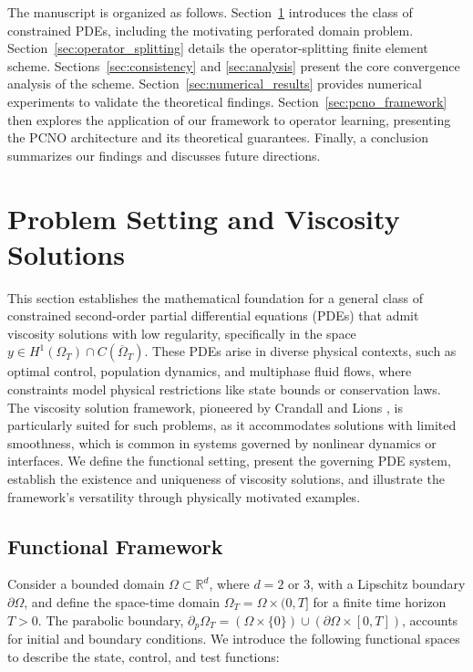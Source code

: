 \documentclass[pdflatex,sn-mathphys-num]{sn-jnl}%
\theoremstyle{thmstyleone}%
\numberwithin{equation}{section}
\begin{document}
The manuscript is organized as follows. Section~\ref{sec:problem} introduces the class of constrained PDEs, including the motivating perforated domain problem. Section~\ref{sec:operator_splitting} details the operator-splitting finite element scheme. Sections~\ref{sec:consistency} and \ref{sec:analysis} present the core convergence analysis of the scheme. Section~\ref{sec:numerical_results} provides numerical experiments to validate the theoretical findings. Section~\ref{sec:pcno_framework} then explores the application of our framework to operator learning, presenting the PCNO architecture and its theoretical guarantees. Finally, a conclusion summarizes our findings and discusses future directions.

\section{Problem Setting and Viscosity Solutions}
\label{sec:problem}

This section establishes the mathematical foundation for a general class of constrained second-order partial differential equations (PDEs) that admit viscosity solutions with low regularity, specifically in the space \( y \in H^1(\Omega_T) \cap C(\overline{\Omega}_T) \). These PDEs arise in diverse physical contexts, such as optimal control, population dynamics, and multiphase fluid flows, where constraints model physical restrictions like state bounds or conservation laws. The viscosity solution framework, pioneered by Crandall and Lions \cite{crandall1983viscosity}, is particularly suited for such problems, as it accommodates solutions with limited smoothness, which is common in systems governed by nonlinear dynamics or interfaces. We define the functional setting, present the governing PDE system, establish the existence and uniqueness of viscosity solutions, and illustrate the framework’s versatility through physically motivated examples.

\subsection{Functional Framework}

Consider a bounded domain \( \Omega \subset \mathbb{R}^d \), where \( d = 2 \) or \( 3 \), with a Lipschitz boundary \( \partial \Omega \), and define the space-time domain \( \Omega_T = \Omega \times (0,T] \) for a finite time horizon \( T > 0 \). The parabolic boundary, \( \partial_p \Omega_T = (\Omega \times \{0\}) \cup (\partial \Omega \times [0,T]) \), accounts for initial and boundary conditions. We introduce the following functional spaces to describe the state, control, and test functions:
\end{document}
